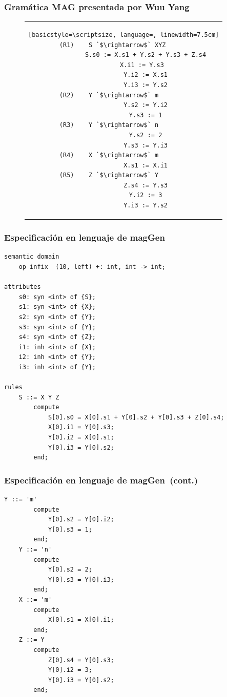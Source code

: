 \documentclass[10pt]{beamer}
\newcommand{\maggen}{\textbf{magGen}}
\begin{document}
\begin{frame}[fragile]
\frametitle{Gramática MAG presentada por Wuu Yang}

\begin{figure}[h]
\begin{center}
\begin{tabular}{c}
\begin{lstlisting}[basicstyle=\scriptsize, language=, linewidth=7.5cm]
(R1)    S `$\rightarrow$` XYZ      
            S.s0 := X.s1 + Y.s2 + Y.s3 + Z.s4
            X.i1 := Y.s3  
            Y.i2 := X.s1
            Y.i3 := Y.s2
(R2)    Y `$\rightarrow$` m        
            Y.s2 := Y.i2
            Y.s3 := 1
(R3)    Y `$\rightarrow$` n        
            Y.s2 := 2
            Y.s3 := Y.i3
(R4)    X `$\rightarrow$` m        
            X.s1 := X.i1
(R5)    Z `$\rightarrow$` Y        
            Z.s4 := Y.s3
            Y.i2 := 3
            Y.i3 := Y.s2
\end{lstlisting} 
\end{tabular}
\end{center}
\end{figure}
\end{frame}

\begin{frame}[fragile]
\frametitle{Especificación en lenguaje de \maggen}

\begin{lstlisting}[basicstyle=\scriptsize, language=specmag, linewidth=10cm]
semantic domain
    op infix  (10, left) +: int, int -> int;

attributes
    s0: syn <int> of {S};
    s1: syn <int> of {X};
    s2: syn <int> of {Y};
    s3: syn <int> of {Y};
    s4: syn <int> of {Z};
    i1: inh <int> of {X};
    i2: inh <int> of {Y};
    i3: inh <int> of {Y};

rules
    S ::= X Y Z
        compute
            S[0].s0 = X[0].s1 + Y[0].s2 + Y[0].s3 + Z[0].s4;
            X[0].i1 = Y[0].s3;
            Y[0].i2 = X[0].s1;
            Y[0].i3 = Y[0].s2;
        end;
\end{lstlisting}
\end{frame}

\begin{frame}[fragile]
\frametitle{Especificación en lenguaje de \maggen\ (cont.)}

\begin{lstlisting}[basicstyle=\scriptsize, language=specmag, linewidth=10cm]
    Y ::= 'm'
        compute
            Y[0].s2 = Y[0].i2;
            Y[0].s3 = 1;
        end;
    Y ::= 'n'
        compute
            Y[0].s2 = 2;
            Y[0].s3 = Y[0].i3;
        end;
    X ::= 'm'
        compute
            X[0].s1 = X[0].i1;
        end;
    Z ::= Y
        compute
            Z[0].s4 = Y[0].s3;
            Y[0].i2 = 3;
            Y[0].i3 = Y[0].s2;
        end;


\end{lstlisting}

\end{frame}
\end{document}
